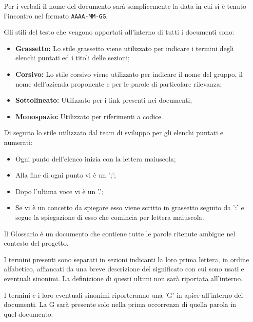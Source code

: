     Per i verbali il nome del documento sarà semplicemente la data in cui si è tenuto l'incontro nel formato \texttt{AAAA-MM-GG}.


    Gli stili del testo che vengono apportati all’interno di tutti i documenti sono:

    \begin{itemize}
      \item \textbf{Grassetto:} Lo stile grassetto viene utilizzato per indicare i termini degli elenchi puntati ed i titoli delle sezioni;
      \item \textbf{Corsivo:} Lo stile corsivo viene utilizzato per indicare il nome del gruppo, il nome dell'azienda proponente e per le parole di particolare rilevanza;
      \item \textbf{Sottolineato:} Utilizzato per i link presenti nei documenti;
      \item \textbf{Monospazio:} Utilizzato per riferimenti a codice.
    \end{itemize}


    Di seguito lo stile utilizzato dal team di sviluppo per gli elenchi puntati e numerati:
    \begin{itemize}
      \item Ogni punto dell'elenco inizia con la lettera maiuscola;
      \item Alla fine di ogni punto vi è un ';';
      \item Dopo l'ultima voce vi è un '.';
      \item Se vi è un concetto da spiegare esso viene scritto in grassetto seguito da ':' e segue la spiegazione di esso che comincia per lettera maiuscola.
    \end{itemize}

    Il Glossario è un documento che contiene tutte le parole ritenute ambigue nel contesto del progetto.

    I termini presenti sono separati in sezioni indicanti la loro prima lettera, in ordine alfabetico, affiancati
    da una breve descrizione del significato con cui sono usati e eventuali sinonimi.
    La definizione di questi ultimi non sarà riportata all'interno.

    I termini e i loro eventuali sinonimi riporteranno una 'G' in apice all'interno dei documenti. La G sarà
    presente solo nella prima occorrenza di quella parola in quel documento.


